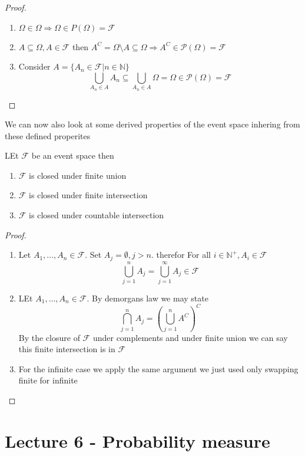 \documentclass{article}
\begin{document}
\begin{proof}
    \begin{enumerate}
        \item $\Omega \in \Omega \Rightarrow\Omega \in P(\Omega) = \mathcal{F}$
        \item $A \subseteq \Omega,A \in \mathcal{F}$ then $A^C = \Omega\text{\textbackslash}A \subseteq \Omega \Rightarrow A^C \in \mathcal{P}(\Omega) = \mathcal{F}$
        \item Consider $A = \{A_n \in \mathcal{F}| n \in \mathbb{N}\}$
        \[\bigcup_{A_n \in A}A_n \subseteq \bigcup_{A_n \in A}\Omega = \Omega \in \mathcal{P}(\Omega) = \mathcal{F} \]
    \end{enumerate}
\end{proof}
We can now also look at some derived properties of the event space inhering from these defined properites
\begin{proposition}
    LEt $\mathcal{F}$ be an event space then
    \begin{enumerate}
        \item $\mathcal{F}$ is closed under finite union
        \item $\mathcal{F}$ is closed under finite intersection
        \item $\mathcal{F}$ is closed under countable intersection
    \end{enumerate}
\end{proposition}
\begin{proof}
    \begin{enumerate}
        \item Let $A_1,\dots,A_n \in \mathcal{F}$. Set $A_j = \emptyset,j > n$. therefor For all $i \in \mathbb{N^+},A_i \in \mathcal{F}$
        \[\bigcup_{j=1}^nA_j = \bigcup_{j=1}^\infty A_j \in \mathcal{F}\]
        \item LEt $A_1, \dots , A_n \in \mathcal{F}$. By demorgans law we may state 
        \[\bigcap_{j=1}^n A_j = \left(\bigcup_{j=1}^n A^C\right)^C\]
        By the closure of $\mathcal{F}$ under complements and under finite union we can say this finite intersection is in $\mathcal{F}$
        \item For the infinite case we apply the same argument we just used only swapping finite for infinite 
    \end{enumerate}
\end{proof}
\section{Lecture 6 - Probability measure}
\end{document}
